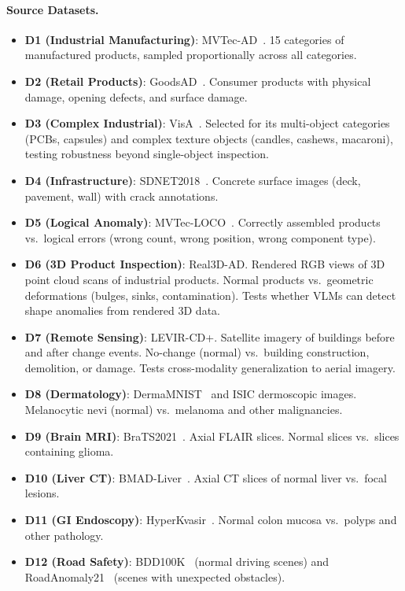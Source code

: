 \paragraph{Source Datasets.}
\begin{itemize}[leftmargin=*,itemsep=2pt]
    \item \textbf{D1 (Industrial Manufacturing)}: MVTec-AD~\citep{bergmann2019mvtec}. 15 categories of manufactured products, sampled proportionally across all categories.
    \item \textbf{D2 (Retail Products)}: GoodsAD~\citep{liang2023goodsad}. Consumer products with physical damage, opening defects, and surface damage.
    \item \textbf{D3 (Complex Industrial)}: VisA~\citep{zou2022visa}. Selected for its multi-object categories (PCBs, capsules) and complex texture objects (candles, cashews, macaroni), testing robustness beyond single-object inspection.
    \item \textbf{D4 (Infrastructure)}: SDNET2018~\citep{dorafshan2018sdnet}. Concrete surface images (deck, pavement, wall) with crack annotations.
    \item \textbf{D5 (Logical Anomaly)}: MVTec-LOCO~\citep{bergmann2022mvtecloco}. Correctly assembled products vs.\ logical errors (wrong count, wrong position, wrong component type).
    \item \textbf{D6 (3D Product Inspection)}: Real3D-AD. Rendered RGB views of 3D point cloud scans of industrial products. Normal products vs.\ geometric deformations (bulges, sinks, contamination). Tests whether VLMs can detect shape anomalies from rendered 3D data.
    \item \textbf{D7 (Remote Sensing)}: LEVIR-CD+. Satellite imagery of buildings before and after change events. No-change (normal) vs.\ building construction, demolition, or damage. Tests cross-modality generalization to aerial imagery.
    \item \textbf{D8 (Dermatology)}: DermaMNIST~\citep{yang2023medmnist} and ISIC dermoscopic images. Melanocytic nevi (normal) vs.\ melanoma and other malignancies.
    \item \textbf{D9 (Brain MRI)}: BraTS2021~\citep{baid2021brats}. Axial FLAIR slices. Normal slices vs.\ slices containing glioma.
    \item \textbf{D10 (Liver CT)}: BMAD-Liver~\citep{bao2024bmad}. Axial CT slices of normal liver vs.\ focal lesions.
    \item \textbf{D11 (GI Endoscopy)}: HyperKvasir~\citep{borgli2020hyperkvasir}. Normal colon mucosa vs.\ polyps and other pathology.
    \item \textbf{D12 (Road Safety)}: BDD100K~\citep{yu2020bdd100k} (normal driving scenes) and RoadAnomaly21~\citep{lis2019detecting} (scenes with unexpected obstacles).
\end{itemize}

